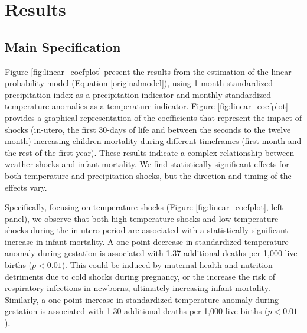 \documentclass[a4paper]{article}
\begin{document}



\section{Results}
\subsection{Main Specification}

Figure \ref{fig:linear_coefplot} present the results from the estimation of the linear probability model (Equation \ref{originalmodel}), using 1-month standardized precipitation index as a precipitation indicator and monthly standardized temperature anomalies as a temperature indicator. Figure \ref{fig:linear_coefplot} provides a graphical representation of the coefficients that represent the impact of shocks (in-utero, the first 30-days of life and between the seconds to the twelve month) increasing children mortality during different timeframes (first month and the rest of the first year). These results indicate a complex relationship between weather shocks and infant mortality.  We find statistically significant effects for both temperature and precipitation shocks, but the direction and timing of the effects vary.

Specifically, focusing on temperature shocks (Figure \ref{fig:linear_coefplot}, left panel), we observe that both high-temperature shocks and low-temperature shocks during the in-utero period are associated with a statistically significant increase in infant mortality.  A one-point decrease in standardized temperature anomaly during gestation is associated with 1.37 additional deaths per 1,000 live births ($p < 0.01$). This could be induced by maternal health and nutrition detriments due to cold shocks during pregnancy, or the increase the risk of respiratory infections in newborns, ultimately increasing infant mortality.  Similarly, a one-point increase in standardized temperature anomaly during gestation is associated with 1.30 additional deaths per 1,000 live births ($p < 0.01$).
\end{document}
